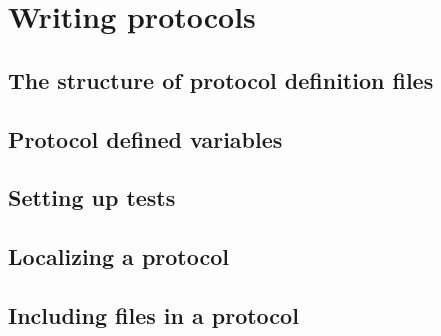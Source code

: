 \chapter{Writing protocols}
\label{ch:WritingProtocols}


\section{The structure of protocol definition files}


\section{Protocol defined variables}


\section{Setting up tests}


\section{Localizing a protocol}


\section{Including files in a protocol}